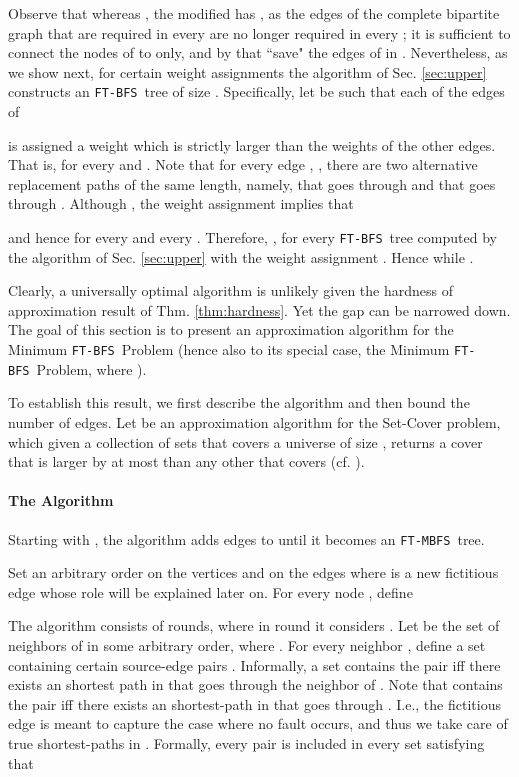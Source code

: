 \documentclass[12pt]{article}
\def\FTMBFS{\mbox{\tt FT-MBFS}}
\def\FTBFS{\mbox{\tt FT-BFS}}
\begin{document}
Observe that whereas ,
the modified  has , as the edges of the
complete bipartite graph  that are required in
every 
are no longer required in every ;
it is sufficient to connect the nodes of  to  only,
and by that ``save" the  edges of  in .
Nevertheless, as we show next, for certain weight assignments the algorithm of
Sec. \ref{sec:upper} constructs an \FTBFS\ tree  of size
.
Specifically, let  be such that each of the edges of

is assigned a weight which is strictly larger than the weights of the other edges. That is,  for every  and
.
Note that for every edge , ,
there are two alternative  replacement paths of the same length, namely,
 that goes through 
and 
that goes through . Although ,
the weight assignment implies that

and hence  for
every  and every .
Therefore, , for every \FTBFS\ tree
 computed by the
algorithm of Sec. \ref{sec:upper} with the weight assignment .
Hence  while .

Clearly, a universally optimal algorithm is unlikely given the hardness
of approximation result of Thm. \ref{thm:hardness}.
Yet the gap can be narrowed down.
The goal of this section is to present an  approximation algorithm
for the Minimum \FTBFS\ Problem (hence also to its special case,
the Minimum \FTBFS\ Problem, where ).

To establish this result, we first describe the algorithm and
then bound the number of edges.
Let  be an 
approximation algorithm for the Set-Cover problem,
which given a collection of sets 
that covers a universe  of size , returns a cover
 that is larger by at most
 than any other  that covers  (cf. \cite{Vazirani97}).

\paragraph{The Algorithm}
Starting with , the algorithm adds edges to  until it becomes an \FTMBFS\ tree.
\par Set an arbitrary order on the vertices
 and on the edges
 where  is a new fictitious edge whose role will be explained later on.
For every node , define

The algorithm consists of  rounds, where in round 
it considers . Let 
be the set of neighbors of  in some arbitrary order, where . For every neighbor , define a set  containing certain source-edge pairs . Informally, a set  contains the pair   iff there exists an  shortest path in  that goes through the neighbor  of .
Note that  contains the pair  
iff there exists an  shortest-path in  that goes through . I.e., the fictitious edge  is meant to capture the case where no fault occurs, and thus we take care of true shortest-paths in . Formally, every pair  is included
in every set  satisfying that
\end{document}
